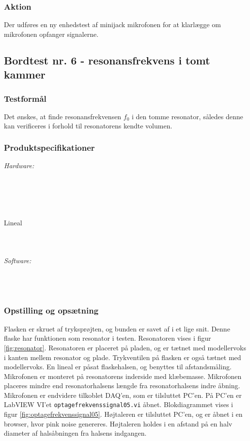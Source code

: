 			\subsubsection{Aktion}
			 Der udføres en ny enhedstest af minijack mikrofonen for at klarlægge om mikrofonen opfanger signalerne. 
			 
	\subsection{Bordtest nr. 6 - resonansfrekvens i tomt kammer}
	
	\subsubsection{Testformål}
	Det ønskes, at finde resonansfrekvensen $f_{0}$ i den tomme resonator, således denne kan verificeres i forhold til resonatorens kendte volumen.  	
	
	\subsubsection{Produktspecifikationer}
	\textit{Hardware:}\\
	\\
	\elektretto\\
	\daq\\
	\\	
	\snot\\	
	Lineal\\
	\modellervoks\\
	\plade\\
	\PC\\
	
	\textit{Software:}\\
	\labview\\
	\daqsoft\\
	\onlineg\\
	
	\subsubsection{Opstilling og opsætning}
	Flasken er skruet af tryksprøjten, og bunden er savet af i et lige snit. Denne flaske har funktionen som resonator i testen. Resonatoren vises i figur \ref{fig:resonator}. Resonatoren er placeret på pladen, og er tætnet med modellervoks i kanten mellem resonator og plade. Trykventilen på flasken er også tætnet med modellervoks. En lineal er påsat flaskehalsen, og benyttes til afstandsmåling. Mikrofonen er monteret på resonatorens inderside med klæbemasse. Mikrofonen placeres mindre end resonatorhalsens længde fra  resonatorhalsens indre åbning. Mikrofonen er endvidere tilkoblet DAQ'en, som er tilsluttet PC'en. På PC'en er LabVIEW VI'et \texttt{optagefrekvenssignal05.vi} åbnet. Blokdiagrammet vises i figur \ref{fig:optagefrekvenssignal05}. Højtaleren er tilsluttet PC'en, og \onlineg er åbnet i en browser, hvor pink noise genereres. Højtaleren holdes i en afstand på en halv diameter af halsåbningen fra halsens indgangen.  
	
